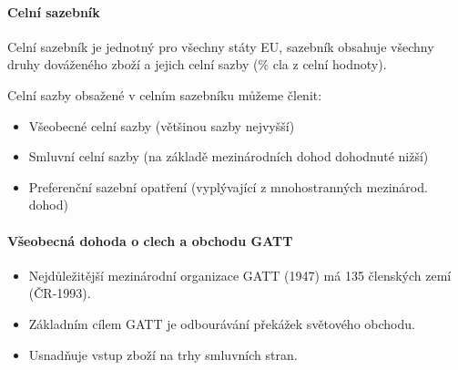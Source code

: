\paragraph{Celní sazebník}
Celní sazebník je jednotný pro všechny státy EU, sazebník obsahuje všechny druhy dováženého zboží a jejich celní sazby (\% cla z celní hodnoty).

Celní sazby obsažené v celním sazebníku můžeme členit:
\begin{itemize}
    \item Všeobecné celní sazby (většinou sazby nejvyšší)
    \item Smluvní celní sazby (na základě mezinárodních dohod dohodnuté nižší)
    \item Preferenční sazební opatření (vyplývající z mnohostranných mezinárod. dohod)   
\end{itemize}

\paragraph{Všeobecná dohoda o clech a obchodu GATT}
\begin{itemize}
    \item Nejdůležitější mezinárodní organizace GATT (1947) má 135 členských zemí (ČR-1993).
    \item Základním cílem GATT je odbourávání překážek světového obchodu. \par
    \item Usnadňuje vstup zboží na trhy smluvních stran.
\end{itemize}